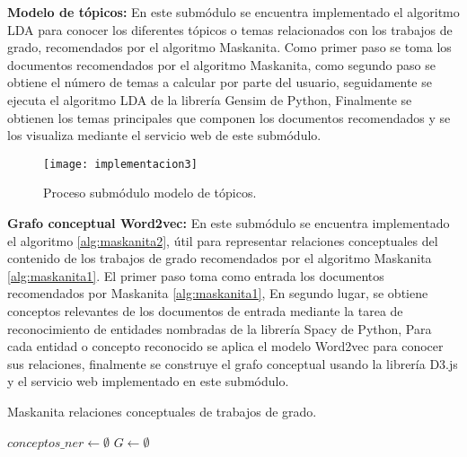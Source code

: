 
\textbf{Modelo de tópicos:} En este submódulo se encuentra implementado el algoritmo LDA para conocer los diferentes tópicos 
o temas relacionados con los trabajos de grado, recomendados por el algoritmo Maskanita. Como primer paso se toma los documentos recomendados por el algoritmo Maskanita, como segundo paso 
se obtiene el número de temas a calcular por parte del usuario, seguidamente se ejecuta el algoritmo LDA de la librería Gensim de Python, 
Finalmente se obtienen los temas principales que componen los documentos recomendados y se los visualiza mediante el servicio web de este submódulo.

\begin{figure}[H]
\centering
\texttt{[image: implementacion3]}
\caption{Proceso submódulo modelo de tópicos.}
\label{fig:implementacion3}
\end{figure}


\textbf{Grafo conceptual Word2vec:} En este submódulo se encuentra implementado  el algoritmo \ref{alg:maskanita2}, útil para representar relaciones conceptuales del contenido de los trabajos de grado recomendados por el algoritmo Maskanita  \ref{alg:maskanita1}. 
El primer paso toma como entrada los documentos recomendados por Maskanita \ref{alg:maskanita1}, En segundo lugar, se obtiene conceptos relevantes de los documentos de entrada mediante la tarea de reconocimiento de entidades nombradas de la librería Spacy de Python,
Para cada entidad o concepto reconocido se aplica el modelo Word2vec para conocer sus relaciones, finalmente se construye el grafo conceptual usando la librería D3.js y  el servicio web implementado en este submódulo.  


\begin{algorithm}[H]
    \renewcommand{\algorithmicrequire}{\textbf{Input:}}
    \renewcommand{\algorithmicensure}{\textbf{Output:}}
    \renewcommand{\algorithmicprint}{\textbf{break}}
  \caption{ Maskanita relaciones conceptuales de trabajos de grado.}
  \label{alg:maskanita2}
  \footnotesize
  \begin{algorithmic}[1]
\STATE $conceptos\_ner \leftarrow \emptyset$
\STATE $G \leftarrow \emptyset$
	\ENDIF
\ENDFOR

	\ENDFOR
\ENDFOR


\end{algorithmic}
\end{algorithm}


